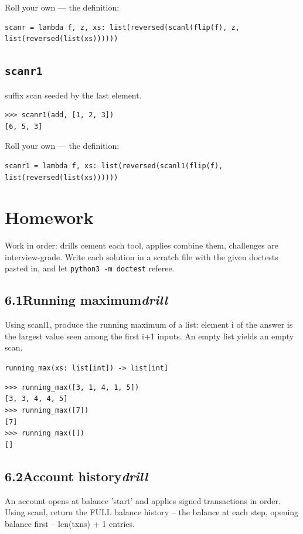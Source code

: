 \documentclass[10pt,letterpaper]{book}
\begin{document}
Roll your own --- the definition:

\begin{lstlisting}[style=ex]
scanr = lambda f, z, xs: list(reversed(scanl(flip(f), z, list(reversed(list(xs))))))
\end{lstlisting}

\subsection{\texttt{scanr1}}\label{def:scanr1}
suffix scan seeded by the last element.
\begin{lstlisting}[style=ex]
>>> scanr1(add, [1, 2, 3])
[6, 5, 3]
\end{lstlisting}

Roll your own --- the definition:

\begin{lstlisting}[style=ex]
scanr1 = lambda f, xs: list(reversed(scanl1(flip(f), list(reversed(list(xs))))))
\end{lstlisting}

\section{Homework}
Work in order: drills cement each tool, applies combine them,
challenges are interview-grade. Write each solution in a scratch file with
the given doctests pasted in, and let \texttt{python3 -m doctest} referee.
\subsection*{6.1\quad Running maximum\hfill\textnormal{\textit{drill}}}
Using scanl1, produce the running maximum of a list: element i of the answer is the largest value seen among the first i+1 inputs. An empty list yields an empty scan.

\noindent\texttt{running\_max(xs: list[int]) -> list[int]}
\begin{lstlisting}[style=ex]
>>> running_max([3, 1, 4, 1, 5])
[3, 3, 4, 4, 5]
>>> running_max([7])
[7]
>>> running_max([])
[]
\end{lstlisting}
\subsection*{6.2\quad Account history\hfill\textnormal{\textit{drill}}}
An account opens at balance 'start' and applies signed transactions in order. Using scanl, return the FULL balance history -- the balance at each step, opening balance first -- len(txns) + 1 entries.
\end{document}
